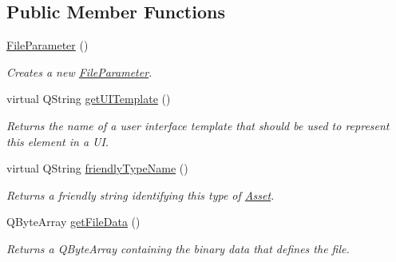 \subsection*{Public Member Functions}
\begin{DoxyCompactItemize}
\item 
\hyperlink{class_picto_1_1_file_parameter_a573474716900e499150422137848c35d}{File\-Parameter} ()
\begin{DoxyCompactList}\small\item\em Creates a new \hyperlink{class_picto_1_1_file_parameter}{File\-Parameter}. \end{DoxyCompactList}\item 
\hypertarget{class_picto_1_1_file_parameter_ae4e89313a320846cad848cbad517f5a4}{virtual Q\-String \hyperlink{class_picto_1_1_file_parameter_ae4e89313a320846cad848cbad517f5a4}{get\-U\-I\-Template} ()}\label{class_picto_1_1_file_parameter_ae4e89313a320846cad848cbad517f5a4}

\begin{DoxyCompactList}\small\item\em Returns the name of a user interface template that should be used to represent this element in a U\-I. \end{DoxyCompactList}\item 
virtual Q\-String \hyperlink{class_picto_1_1_file_parameter_a4f53c44dc540d01757ef457525a50557}{friendly\-Type\-Name} ()
\begin{DoxyCompactList}\small\item\em Returns a friendly string identifying this type of \hyperlink{class_picto_1_1_asset}{Asset}. \end{DoxyCompactList}\item 
Q\-Byte\-Array \hyperlink{class_picto_1_1_file_parameter_aeb76b3e3e5f153644c1beac7a649b067}{get\-File\-Data} ()
\begin{DoxyCompactList}\small\item\em Returns a Q\-Byte\-Array containing the binary data that defines the file. \end{DoxyCompactList}\end{DoxyCompactItemize}
